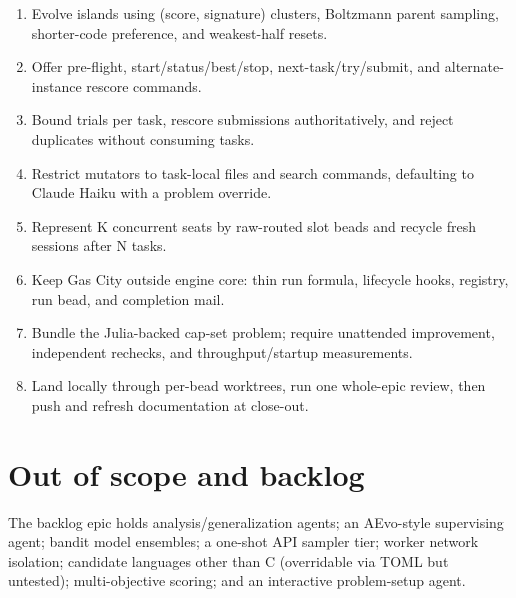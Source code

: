 \documentclass[11pt]{article}
\begin{document}
\begin{enumerate}
\item Evolve islands using (score, signature) clusters, Boltzmann parent sampling, shorter-code preference, and weakest-half resets.
\item Offer pre-flight, start/status/best/stop, next-task/try/submit, and alternate-instance rescore commands.
\item Bound trials per task, rescore submissions authoritatively, and reject duplicates without consuming tasks.
\item Restrict mutators to task-local files and search commands, defaulting to Claude Haiku with a problem override.
\item Represent K concurrent seats by raw-routed slot beads and recycle fresh sessions after N tasks.
\item Keep Gas City outside engine core: thin run formula, lifecycle hooks, registry, run bead, and completion mail.
\item Bundle the Julia-backed cap-set problem; require unattended improvement, independent rechecks, and throughput/startup measurements.
\item Land locally through per-bead worktrees, run one whole-epic review, then push and refresh documentation at close-out.
\end{enumerate}

\section{Out of scope and backlog}
The backlog epic holds analysis/generalization agents; an AEvo-style supervising
agent; bandit model ensembles; a one-shot API sampler tier; worker network
isolation; candidate languages other than C (overridable via TOML but untested);
multi-objective scoring; and an interactive problem-setup agent.
\end{document}
